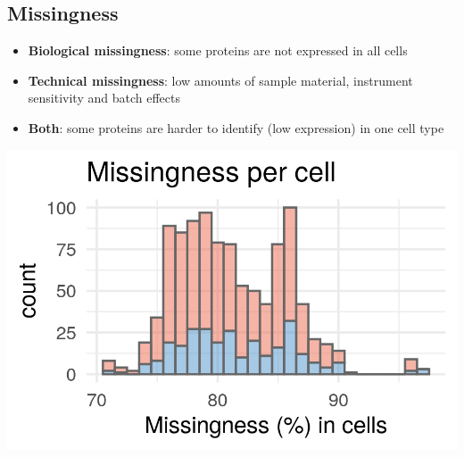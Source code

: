 \documentclass{article}
\begin{document}
\begin{multicols}{2}
\begin{minipage}[t]{\linewidth}
\end{minipage}


\noindent
\vspace{-1cm}
\section*{\huge Missingness}
\begin{minipage}[h]{0.35\linewidth}
  
  \begin{itemize}
    \item \textbf{Biological missingness}: some proteins are not 
    expressed in all cells
    \item \textbf{Technical missingness}: low amounts of sample 
    material, instrument sensitivity and batch effects
    \item \textbf{Both}: some proteins are harder to identify (low 
    expression) in one cell type
  \end{itemize}
  
  \includegraphics[width=1.2\linewidth]{figs/missing_cell.png}


\end{minipage}
\end{multicols}
\end{document}
